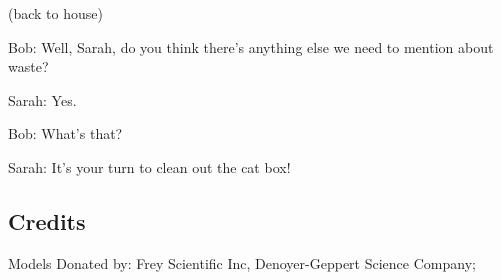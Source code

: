 (back to house)

Bob: Well, Sarah, do you think there's anything else we need to mention about waste?

Sarah: Yes.

Bob: What's that?

Sarah: It's your turn to clean out the cat box!

\subsection{Credits}

Models Donated by: Frey Scientific Inc, Denoyer-Geppert Science Company;